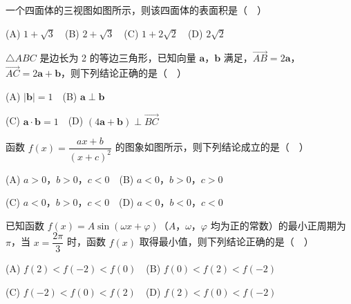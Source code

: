 \begin{question}
一个四面体的三视图如图所示，则该四面体的表面积是（　）
\nopagebreak[4]
\begin{center}\end{center}
\nopagebreak[4]
(A) \(1+\sqrt{3}\)　(B) \(2+\sqrt{3}\)　(C) \(1+2\sqrt{2}\)　(D) \(2\sqrt{2}\)

\end{question}
\begin{question}
\(\triangle ABC\) 是边长为 2 的等边三角形，已知向量 \(\boldsymbol{a}\)，\(\boldsymbol{b}\) 满足，\(\overrightarrow{AB}=2\boldsymbol{a}\)，\(\overrightarrow{AC}=2\boldsymbol{a}+\boldsymbol{b}\)，则下列结论正确的是（　）

(A) \(|\boldsymbol{b}|=1\)　(B) \(\boldsymbol{a}\perp\boldsymbol{b}\)

(C) \(\boldsymbol{a}\cdot\boldsymbol{b}=1\)　(D) \((4\boldsymbol{a}+\boldsymbol{b})\perp\overrightarrow{BC}\)

\Needspace{0.4\textheight}
\end{question}
\begin{question}
函数 \(f(x)=\dfrac{ax+b}{(x+c)^2}\) 的图象如图所示，则下列结论成立的是（　）
\nopagebreak[4]
\begin{center}\end{center}
\nopagebreak[4]
(A) \(a>0\)，\(b>0\)，\(c<0\)　(B) \(a<0\)，\(b>0\)，\(c>0\)

(C) \(a<0\)，\(b>0\)，\(c<0\)　(D) \(a<0\)，\(b<0\)，\(c<0\)

\end{question}
\begin{question}
已知函数 \(f(x)=A\sin(\omega x+\varphi)\)（\(A\)，\(\omega\)，\(\varphi\) 均为正的常数）的最小正周期为 \(\pi\)，当 \(x=\dfrac{2\pi}{3}\) 时，函数 \(f(x)\) 取得最小值，则下列结论正确的是（　）

(A) \(f(2)<f(-2)<f(0)\)　(B) \(f(0)<f(2)<f(-2)\)

(C) \(f(-2)<f(0)<f(2)\)　(D) \(f(2)<f(0)<f(-2)\)

\end{question}

